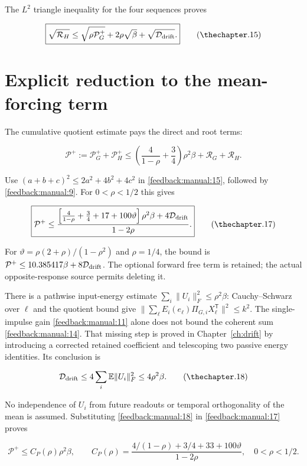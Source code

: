 \documentclass[11pt,oneside,openany,a4paper]{book}
\numberwithin{equation}{chapter}
\theoremstyle{definition}
\theoremstyle{remark}
\begin{document}
The \(L^2\) triangle inequality for the four sequences proves

\[
\boxed{\sqrt{\mathcal R_H}\le\sqrt{\rho\mathcal P_G^+}
+2\rho\sqrt\beta+\sqrt{\mathcal D_{\rm drift}}.}
\tag{\thechapter.15}\label{feedback:manual:15}
\]

\section{Explicit reduction to the mean-forcing term}\label{feedback:explicit-reduction-to-the-mean-forcing-term}

The cumulative quotient estimate pays the direct and root terms:

\[
\mathcal P^+:=\mathcal P_G^++\mathcal P_H^+
\le\left(\frac4{1-\rho}+\frac34\right)\rho^2\beta+\mathcal R_G+\mathcal R_H.
\tag{\thechapter.16}\label{feedback:manual:16}
\]

Use \((a+b+c)^2\le2a^2+4b^2+4c^2\) in \eqref{feedback:manual:15}, followed by \eqref{feedback:manual:9}. For \(0<\rho<1/2\) this gives

\[
\boxed{\mathcal P^+\le
\frac{\left[\frac4{1-\rho}+\frac34+17+100\vartheta\right]\rho^2\beta
+4\mathcal D_{\rm drift}}{1-2\rho}.}
\tag{\thechapter.17}\label{feedback:manual:17}
\]

For \(\vartheta=\rho(2+\rho)/(1-\rho^2)\) and \(\rho=1/4\), the bound is \(\mathcal P^+\le10.385417\beta+8\mathcal D_{\rm drift}\). The optional forward free term is retained; the actual opposite-response source permits deleting it.

There is a pathwise input-energy estimate \(\sum_i\|U_i\|_F^2\le\rho^2\beta\): Cauchy--Schwarz over \(\ell\) and the quotient bound give \(\|\sum_\ell E_i(e_\ell)\Pi_{G,i}X_\ell^{\mathsf T}\|^2\le k^2\). The single-impulse gain \eqref{feedback:manual:11} alone does not bound the coherent sum \eqref{feedback:manual:14}. That missing step is proved in Chapter~\ref{ch:drift} by introducing a corrected retained coefficient and telescoping two passive energy identities. Its conclusion is

\[
\mathcal D_{\rm drift}\le4\sum_i\mathbb E\|U_i\|_F^2\le4\rho^2\beta.
\tag{\thechapter.18}\label{feedback:manual:18}
\]

No independence of \(U_i\) from future readouts or temporal orthogonality of the mean is assumed. Substituting \eqref{feedback:manual:18} in \eqref{feedback:manual:17} proves

\[
\mathcal P^+\le C_P(\rho)\rho^2\beta,\qquad
C_P(\rho)=\frac{4/(1-\rho)+3/4+33+100\vartheta}{1-2\rho},
\quad 0<\rho<1/2.
\tag{\thechapter.19}\label{feedback:manual:19}
\]
\end{document}
